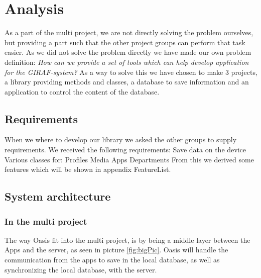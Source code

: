 \chapter{Analysis}
As a part of the multi project, we are not directly solving the problem ourselves, but providing a part such that the other project groups can perform that task easier.
As we did not solve the problem directly we have made our own problem definition:
	\textit{How can we provide a set of tools which can help develop application for the GIRAF-system?}
As a way to solve this we have chosen to make 3 projects, a library providing methods and classes, a database to save information and an application to control the content of the database. 

\section{Requirements}
When we where to develop our library we asked the other groups to supply requirements. We received the following requirements:
Save data on the device
Various classes for:
Profiles
Media
Apps
Departments
From this we derived some features which will be shown in appendix FeatureList.

\section{System architecture}
\subsection{In the multi project}
The way Oasis fit into the multi project, is by being a middle layer between the Apps and the server, as seen in picture \vref{fig:bigPic}. Oasis will handle the communication from the apps to save in the local database, as well as synchronizing the local database, with the server.

